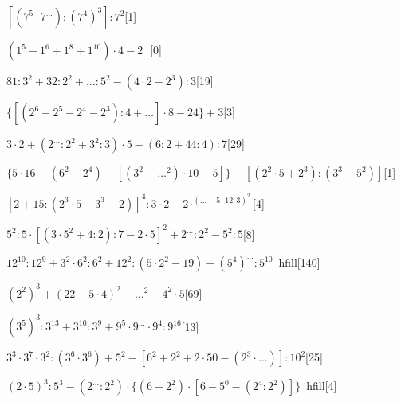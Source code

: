\begin{esercizio} %
\([(7^5\cdot7^{\dots}):(7^4)^3]:7^2\)\hfill[1]
\end{esercizio}
\begin{esercizio} %
\((1^5+1^6+1^8+1^{10})\cdot4-2^{\dots}\)\hfill[0]
\end{esercizio}
\begin{esercizio} %
\(81:3^2+32:2^2+{\dots}:5^2-(4\cdot2-2^3):3\)\hfill[19]
\end{esercizio}
\begin{esercizio} %
\(\{[(2^6-2^5-2^4-2^3):4+{\dots}]\cdot8-24\}+3\)\hfill[3]
\end{esercizio}
\begin{esercizio} %
\(3\cdot2+(2^{\dots}:2^2+3^2:3)\cdot5-(6:2+44:4):7\)\hfill[29]
\end{esercizio}
\begin{esercizio} %
\(\{5\cdot16-(6^2-2^4)-[(3^2-{\dots}^2)\cdot10-5]\}-[(2^2\cdot5+2^3):(3^3-5^2)
]\)\hfill[1]
\end{esercizio}
\begin{esercizio} %
\([2+15:(2^3\cdot5-3^3+2)]^4:3\cdot2-2\cdot^({\dots}-5\cdot12:3)^2\)\hfill[4]
\end{esercizio}
\begin{esercizio} %
\(5^2:5\cdot[(3\cdot5^2+4:2):7-2\cdot5]^2+2^{\dots}:2^2-5^2:5\)\hfill[8]
\end{esercizio}
\begin{esercizio} %
\(12^{10}:12^9+3^2\cdot6^2:6^2+12^2:(5\cdot2^2-19)-(5^4)^{\dots}:5^{10}\)\
hfill[140]
\end{esercizio}
\begin{esercizio} %
\((2^2)^3+(22-5\cdot4)^2+{\dots}^2-4^2\cdot5\)\hfill[69]
\end{esercizio}
\begin{esercizio} %
\((3^5)^3:3^{13}+3^{10}:3^9+9^5\cdot9^{\dots}\cdot9^4:9^{16}\)\hfill[13]
\end{esercizio}
\begin{esercizio} %
\(3^3\cdot3^7\cdot3^2:(3^6\cdot3^6)+5^2-[6^2+2^2+2\cdot50-(2^3\cdot{\dots})]:
10^2\)\hfill[25]
\end{esercizio}
\begin{esercizio} %
\((2\cdot5)^3:5^3-(2^{\dots}:2^2)\cdot\{(6-2^2)\cdot[6-5^0-(2^4:2^2)]\}\)\
hfill[4]
\end{esercizio}
